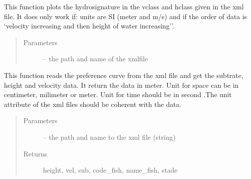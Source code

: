 \documentclass[letterpaper,10pt,english]{sphinxmanual}
\begin{document}
\begin{fulllineitems}
\label{\detokenize{index:src.bio_info.plot_hydrosignature}}
This function plots the hydrosignature in the vclass and hclass given in the xml file.
It does only work if: units are SI (meter and m/s) and if the order of data is `velocity increasing
and then height of water increasing''.
\begin{quote}\begin{description}
\item[{Parameters}] \leavevmode
{} -- the path and name of the xmlfile

\end{description}\end{quote}

\end{fulllineitems}


\begin{fulllineitems}
\label{\detokenize{index:src.bio_info.read_pref}}
This function reads the preference curve from the xml file and get the subtrate, height and velocity data.
It return the data in meter. Unit for space can be in centimeter, milimeter or meter. Unit for time should be in
second .The unit attribute of the xml files should be coherent with the data.
\begin{quote}\begin{description}
\item[{Parameters}] \leavevmode
{} -- the path and name to the xml file (string)

\item[{Returns}] \leavevmode
height, vel, sub, code\_fish, name\_fish, stade

\end{description}\end{quote}

\end{fulllineitems}

\end{document}
